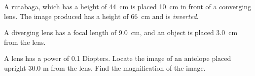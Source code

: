 \documentclass[10pt]{exam}
\begin{document}
\begin{questions}
  \question
    A rutabaga, which has a height of 44~cm is placed 10~cm in front of a converging lens.  The image produced has a height of 66~cm and is \emph{inverted}.  

    \vs

  \question
    A diverging lens has a focal length of 9.0~cm, and an object is placed 3.0~cm from the lens.

    \vs

  \question
    A lens has a power of 0.1 Diopters.  Locate the image of an antelope placed upright 30.0 m from the lens.  Find the magnification of the image.  
    \vs

\end{questions}
\end{document}
